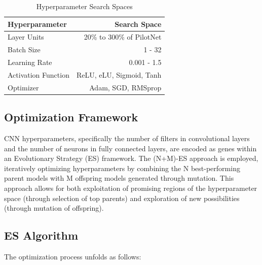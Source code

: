 \documentclass[conference]{IEEEtran}
\begin{document}
\begin{table}[h]
    \centering
    \caption{Hyperparameter Search Spaces}
    \begin{tabular}{l|r}
    
        \textbf{Hyperparameter}  & \textbf{Search Space} \\
        \hline
        Layer Units             & 20\% to 300\% of PilotNet \\
        Batch Size              & 1 - 32                    \\
        Learning Rate           & 0.001 - 1.5               \\
        Activation Function     & ReLU, eLU, Sigmoid, Tanh  \\
        Optimizer               & Adam, SGD, RMSprop        \\
        
    \end{tabular}
    \label{tab:searchspace}
\end{table}
    


\subsection{Optimization Framework}

CNN hyperparameters, specifically the number of filters in convolutional layers and the number of neurons in fully connected layers, are encoded as genes within an Evolutionary Strategy (ES) framework. The (N+M)-ES approach is employed, iteratively optimizing hyperparameters by combining the N best-performing parent models with M offspring models generated through mutation. This approach allows for both exploitation of promising regions of the hyperparameter space (through selection of top parents) and exploration of new possibilities (through mutation of offspring).

\subsection{ES Algorithm}

The optimization process unfolds as follows:
\end{document}
